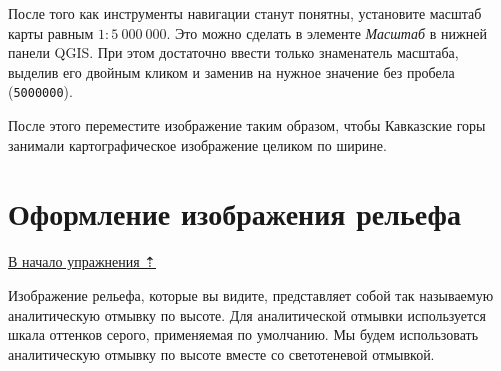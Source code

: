 \documentclass[
  12pt,
]{book}
\begin{document}
После того как инструменты навигации станут понятны, установите масштаб карты равным \(1:5~000~000\). Это можно сделать в элементе \emph{Масштаб} в нижней панели QGIS. При этом достаточно ввести только знаменатель масштаба, выделив его двойным кликом и заменив на нужное значение без пробела (\texttt{5000000}).

После этого переместите изображение таким образом, чтобы Кавказские горы занимали картографическое изображение целиком по ширине.

\hypertarget{map-design-general-relief}{%
\section{Оформление изображения рельефа}\label{map-design-general-relief}}

\protect\hyperlink{map-design-general}{В начало упражнения ⇡}

Изображение рельефа, которые вы видите, представляет собой так называемую аналитическую отмывку по высоте. Для аналитической отмывки используется шкала оттенков серого, применяемая по умолчанию. Мы будем использовать аналитическую отмывку по высоте вместе со светотеневой отмывкой.
\end{document}
